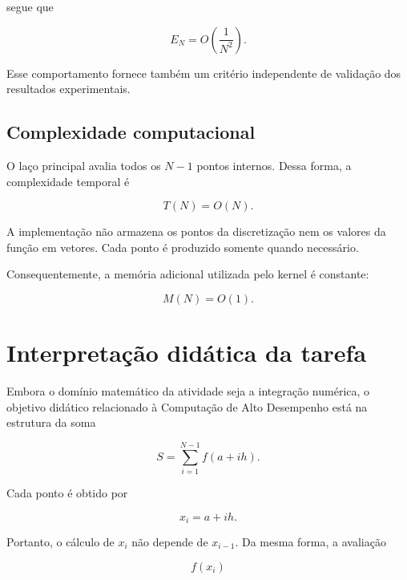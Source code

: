 segue que

\begin{equation}
    E_N = O\left(\frac{1}{N^2}\right).
\end{equation}

Esse comportamento fornece também um critério independente de validação dos
resultados experimentais.

\subsection{Complexidade computacional}

O laço principal avalia todos os \(N-1\) pontos internos. Dessa forma, a
complexidade temporal é

\begin{equation}
    T(N)=O(N).
\end{equation}

A implementação não armazena os pontos da discretização nem os valores da
função em vetores. Cada ponto é produzido somente quando necessário.

Consequentemente, a memória adicional utilizada pelo kernel é constante:

\begin{equation}
    M(N)=O(1).
\end{equation}


\section{Interpretação didática da tarefa}

\label{sec:atvd04-interpretacao}

Embora o domínio matemático da atividade seja a integração numérica, o
objetivo didático relacionado à Computação de Alto Desempenho está na
estrutura da soma

\begin{equation}
    S =
    \sum_{i=1}^{N-1} f(a+ih).
\end{equation}

Cada ponto é obtido por

\begin{equation}
    x_i=a+ih.
\end{equation}

Portanto, o cálculo de \(x_i\) não depende de \(x_{i-1}\). Da mesma forma,
a avaliação

\begin{equation}
    f(x_i)
\end{equation}

